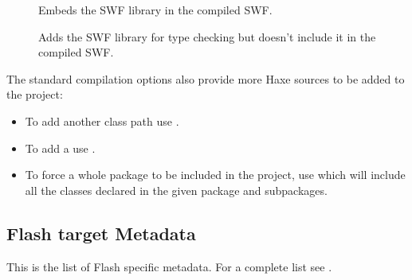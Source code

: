 \begin{description}
	\item[] Embeds the SWF library in the compiled SWF.
	\item[] Adds the SWF library for type checking but doesn't include it in the compiled SWF.
\end{description}

The standard compilation options also provide more Haxe sources to be added to the project:

\begin{itemize}
	\item To add another class path use .
	\item To add a  use .
	\item To force a whole package to be included in the project, use  which will include all the classes declared in the given package and subpackages. 
\end{itemize}

\subsection{Flash target Metadata}
\label{target-flash-metadata}

This is the list of Flash specific metadata. For a complete list see .

